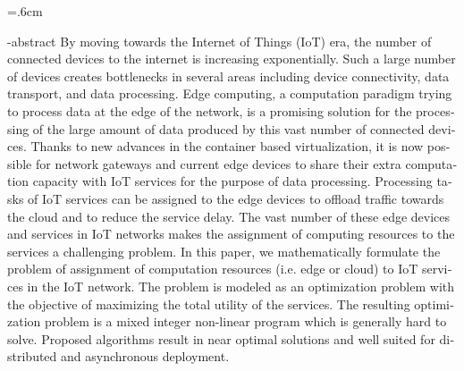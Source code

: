
\baselineskip=.6cm
\begin{latin}
  \blankpage
  \en-abstract{
    By moving towards the Internet of Things (IoT) era, the number of connected devices to the internet is increasing exponentially.
    Such a large number of devices creates bottlenecks in several areas including device connectivity, data transport, and data processing.
    Edge computing, a computation paradigm trying to process data at the edge of the network, is a promising solution for the processing of the large amount of data produced by this vast number of connected devices.
    Thanks to new advances in the container based virtualization, it is now possible for network gateways and current edge devices to share their extra computation capacity with IoT services for the purpose of data processing.
    Processing tasks of IoT services can be assigned to the edge devices to offload traffic towards the cloud and to reduce the service delay.
    The vast number of these edge devices and services in IoT networks makes the assignment of computing resources to the services a challenging problem.
    In this paper, we mathematically formulate the problem of assignment of computation resources (i.e. edge or cloud) to IoT services in the IoT network.
    The problem is modeled as an optimization problem with the objective of maximizing the total utility of the services.
    The resulting optimization problem is a mixed integer non-linear program which is generally hard to solve.
    Proposed algorithms result in near optimal solutions and well suited for distributed and asynchronous deployment.
    \blankpage
  }

\latinfirstPage
\end{latin}
